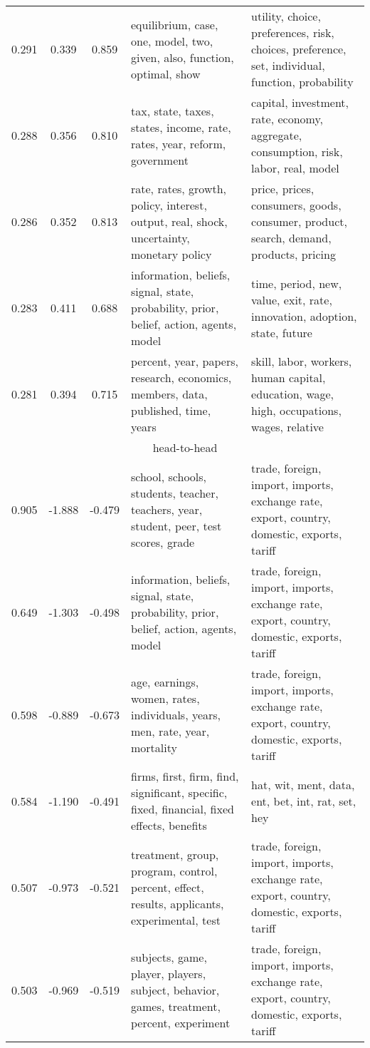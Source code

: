 \begin{tabular}{cccp{5cm}p{5cm}}
0.291 & 0.339 & 0.859 & equilibrium, case, one, model, two, given, also, function, optimal, show & utility, choice, preferences, risk, choices, preference, set, individual, function, probability \\
0.288 & 0.356 & 0.810 & tax, state, taxes, states, income, rate, rates, year, reform, government & capital, investment, rate, economy, aggregate, consumption, risk, labor, real, model \\
0.286 & 0.352 & 0.813 & rate, rates, growth, policy, interest, output, real, shock, uncertainty, monetary policy & price, prices, consumers, goods, consumer, product, search, demand, products, pricing \\
0.283 & 0.411 & 0.688 & information, beliefs, signal, state, probability, prior, belief, action, agents, model & time, period, new, value, exit, rate, innovation, adoption, state, future \\
0.281 & 0.394 & 0.715 & percent, year, papers, research, economics, members, data, published, time, years & skill, labor, workers, human capital, education, wage, high, occupations, wages, relative \\
\midrule
\multicolumn{5}{c}{head-to-head}\\
0.905 & -1.888 & -0.479 & school, schools, students, teacher, teachers, year, student, peer, test scores, grade & trade, foreign, import, imports, exchange rate, export, country, domestic, exports, tariff \\
0.649 & -1.303 & -0.498 & information, beliefs, signal, state, probability, prior, belief, action, agents, model & trade, foreign, import, imports, exchange rate, export, country, domestic, exports, tariff \\
0.598 & -0.889 & -0.673 & age, earnings, women, rates, individuals, years, men, rate, year, mortality & trade, foreign, import, imports, exchange rate, export, country, domestic, exports, tariff \\
0.584 & -1.190 & -0.491 & firms, first, firm, find, significant, specific, fixed, financial, fixed effects, benefits & hat, wit, ment, data, ent, bet, int, rat, set, hey \\
0.507 & -0.973 & -0.521 & treatment, group, program, control, percent, effect, results, applicants, experimental, test & trade, foreign, import, imports, exchange rate, export, country, domestic, exports, tariff \\
0.503 & -0.969 & -0.519 & subjects, game, player, players, subject, behavior, games, treatment, percent, experiment & trade, foreign, import, imports, exchange rate, export, country, domestic, exports, tariff \\

\end{tabular}
